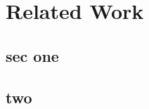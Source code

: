 
\lhead[\chaptername~\thechapter]{\rightmark}

\rhead[\leftmark]{}

\lfoot[\thepage]{}

\cfoot{}

\rfoot[]{\thepage}


\chapter{Related Work}
\label{cha:relatedWork}
\lipsum*[1-1]

\section{sec one}
\lipsum*[1-10]

\section{two}
\lipsum[1-2]

